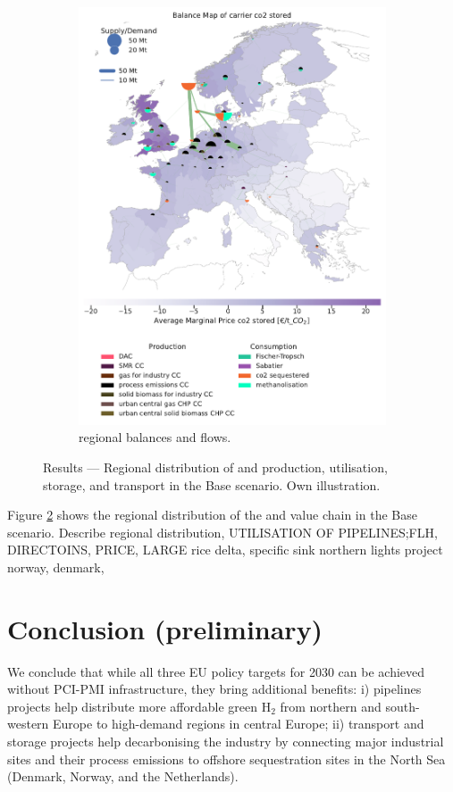 \documentclass[10pt]{article}
\begin{document}
\begin{figure}[h!]
\begin{subfigure}[t]{0.495\textwidth}
        \includegraphics[width=\textwidth]{balance_map_co2} %
        \caption{ regional balances and flows.}
        \label{fig:balance_map_co2}
    \end{subfigure}
    \caption{Results --- Regional distribution of  and  production, utilisation, storage, and transport in the Base scenario. Own illustration.}
    \label{fig:balance_maps}
\end{figure}

Figure \ref{fig:balance_maps} shows the regional distribution of the  and  value chain in the Base scenario. Describe regional distribution, UTILISATION OF PIPELINES;FLH, DIRECTOINS, PRICE, LARGE rice delta, specific sink northern lights project norway, denmark, 

\section*{Conclusion (preliminary)}
We conclude that while all three EU policy targets for 2030 can be achieved without PCI-PMI infrastructure, they bring additional benefits: i)  pipelines projects help distribute more affordable green H$_2$ from northern and south-western Europe to high-demand regions in central Europe; ii)  transport and storage projects help decarbonising the industry by connecting major industrial sites and their process emissions to offshore sequestration sites in the North Sea (Denmark, Norway, and the Netherlands).
\end{document}

